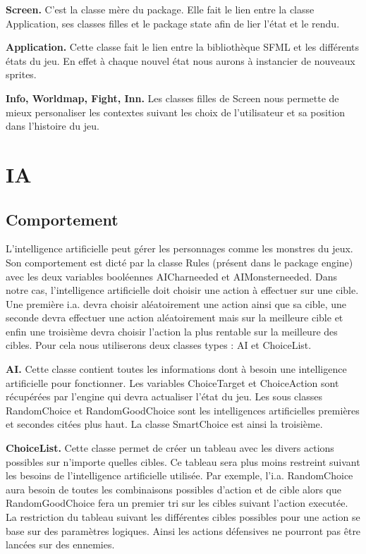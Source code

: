 \documentclass[12pt,a4paper]{report}
\begin{document}
\textbf{Screen.} C'est la classe m\`{e}re du package. Elle fait le lien entre la classe Application, ses classes filles et le package state afin de lier l'\'{e}tat et le rendu.

\textbf{Application.} Cette classe fait le lien entre la biblioth\`{e}que SFML et les diff\'{e}rents \'{e}tats du jeu. En effet \`{a} chaque nouvel \'{e}tat nous aurons \`{a} instancier de nouveaux sprites.

\textbf{Info, Worldmap, Fight, Inn.} Les classes filles de Screen nous permette de mieux personaliser les contextes suivant les choix de l'utilisateur et sa position dans l'histoire du jeu.


\chapter{IA}

\section{Comportement}

L'intelligence artificielle peut g\'{e}rer les personnages comme les monstres du jeux. Son comportement est dict\'{e} par la classe Rules (pr\'{e}sent dans le package engine) avec les deux variables bool\'{e}ennes AICharneeded et AIMonsterneeded.
Dans notre cas, l'intelligence artificielle doit choisir une action \`{a} effectuer sur une cible. Une premi\`{e}re i.a. devra choisir al\'{e}atoirement une action ainsi que sa cible, une seconde devra effectuer une action al\'{e}atoirement mais sur la meilleure cible et enfin une troisi\`{e}me devra choisir l'action la plus rentable sur la meilleure des cibles.
Pour cela nous utiliserons deux classes types : AI et ChoiceList.

\textbf{AI.} Cette classe contient toutes les informations dont \`{a} besoin une intelligence artificielle pour fonctionner. Les variables ChoiceTarget et ChoiceAction sont r\'{e}cup\'{e}r\'{e}es par l'engine qui devra actualiser l'\'{e}tat du jeu. Les sous classes RandomChoice et RandomGoodChoice sont les intelligences artificielles premi\`{e}res et secondes cit\'{e}es plus haut. La classe SmartChoice est ainsi la troisi\`{e}me.

\textbf{ChoiceList.} Cette classe permet de cr\'{e}er un tableau avec les divers actions possibles sur n'importe quelles cibles. Ce tableau sera plus moins restreint suivant les besoins de l'intelligence artificielle utilis\'{e}e. Par exemple, l'i.a. RandomChoice aura besoin de toutes les combinaisons possibles d'action et de cible alors que RandomGoodChoice fera un premier tri sur les cibles suivant l'action execut\'{e}e. La restriction du tableau suivant les diff\'{e}rentes cibles possibles pour une action se base sur des param\`{e}tres logiques. Ainsi les actions d\'{e}fensives ne pourront pas \^{e}tre lanc\'{e}es sur des ennemies.
\end{document}
